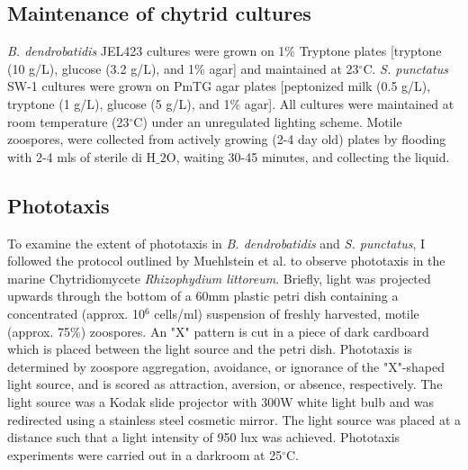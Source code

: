 \subsection*{Maintenance of chytrid cultures}
\textit{B. dendrobatidis} JEL423 cultures were grown on 1\% Tryptone plates [tryptone (10 g/L), glucose (3.2 g/L), and 1\% agar] and maintained at 23$^{\circ}$C. \textit{S. punctatus} SW-1 cultures were grown on PmTG agar plates [peptonized milk (0.5 g/L), tryptone (1 g/L), glucose (5 g/L), and 1\% agar]. All cultures were maintained at room temperature (23$^{\circ}$C) under an unregulated lighting scheme. Motile zoospores, were collected from actively growing (2-4 day old) plates by flooding with 2-4 mls of sterile di H$\_{2}$O, waiting 30-45 minutes, and collecting the liquid. \\
\subsection*{Phototaxis}
To examine the extent of phototaxis in \textit{B. dendrobatidis} and \textit{S. punctatus}, I followed the protocol outlined by Muehlstein et al.\nocite{Muehlstein1987} to observe phototaxis in the marine Chytridiomycete \textit{Rhizophydium littoreum}. Briefly, light was projected upwards through the bottom of a 60mm plastic petri dish containing a concentrated (approx. 10$^{6}$ cells/ml) suspension of freshly harvested, motile (approx. 75\%) zoospores. An "X" pattern is cut in a piece of dark cardboard which is placed between the light source and the petri dish. Phototaxis is determined by zoospore aggregation, avoidance, or ignorance of the "X"-shaped light source, and is scored as attraction, aversion, or absence, respectively. The light source was a Kodak slide projector with 300W white light bulb and was redirected using a stainless steel cosmetic mirror. The light source was placed at a distance such that a light intensity of 950 lux was achieved. Phototaxis experiments were carried out in a darkroom at 25$^{\circ}$C.\\ 
